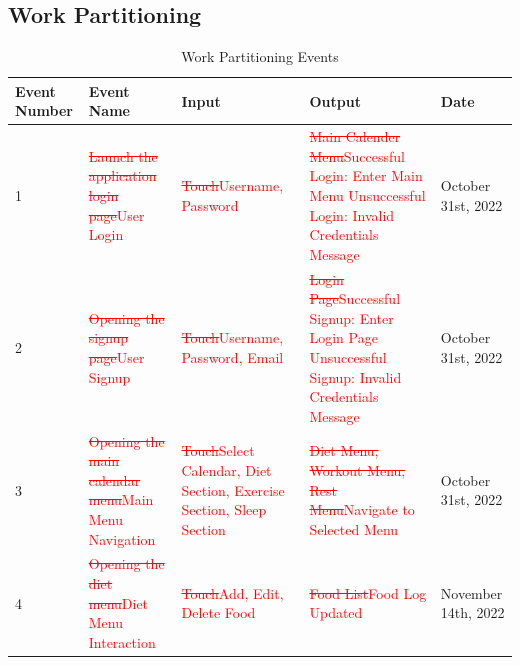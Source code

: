 \documentclass[12pt,letterpaper]{article}
\begin{document}
\subsection{Work Partitioning}
\begin{table}[h!]
	\caption{Work Partitioning Events}
	\centering
	\begin{tabularx}{\columnwidth}{|X|X|X|X|X|}
		\hline
		\centering\textbf{Event Number} & \centering\textbf{Event Name} & \centering\textbf{Input} & \centering\textbf{Output} & \textbf{Date}\\
		\hline
		1 & \textcolor{red}{\sout{Launch the application login page}}\newline \textcolor{red}{User Login} & \textcolor{red}{\sout{Touch}}\newline \textcolor{red}{Username, Password} & \textcolor{red}{\sout{Main Calender Menu}}\newline \textcolor{red}{Successful Login: Enter Main Menu \newline Unsuccessful Login: Invalid Credentials Message}  & October 31st, 2022\\
		\hline
		2 &  \textcolor{red}{\sout{Opening the signup page}}\newline \textcolor{red}{User Signup} & \textcolor{red}{\sout{Touch}}\newline \textcolor{red}{Username, Password, Email} & \textcolor{red}{\sout{Login Page}}\newline \textcolor{red}{Successful Signup: Enter Login Page \newline Unsuccessful Signup: Invalid Credentials Message} & October 31st, 2022\\
		\hline
		3 & \textcolor{red}{\sout{Opening the main calendar menu}}\newline \textcolor{red}{Main Menu Navigation} & \textcolor{red}{\sout{Touch}}\newline \textcolor{red}{Select Calendar, Diet Section, Exercise Section, Sleep Section} & \textcolor{red}{\sout{ Diet Menu, Workout Menu, Rest Menu}}\newline\textcolor{red}{Navigate to Selected Menu} & October 31st, 2022\\
		\hline
		4 & \textcolor{red}{\sout{Opening the diet menu}}\newline \textcolor{red}{Diet Menu Interaction} & \textcolor{red}{\sout{Touch}}\newline \textcolor{red}{Add, Edit, Delete Food} &\textcolor{red}{\sout{Food List}}\newline \textcolor{red}{Food Log Updated} & November 14th, 2022\\

\end{tabularx}
\end{table}
\end{document}
